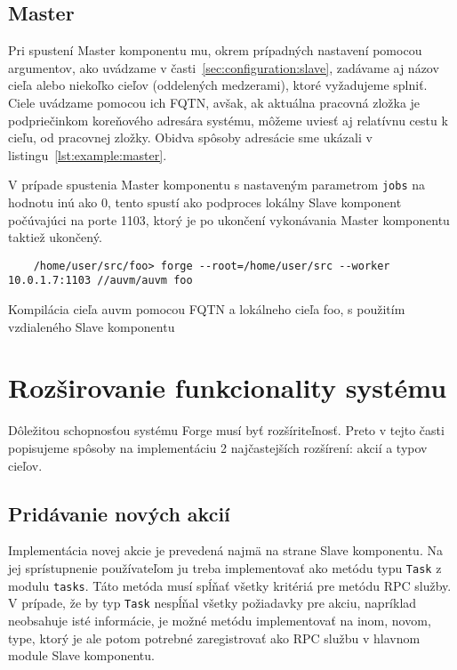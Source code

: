 \subsection{Master}
\label{sec:usage:client}

Pri spustení Master komponentu mu, okrem prípadných nastavení pomocou argumentov,
ako uvádzame v časti~\ref{sec:configuration:slave}, zadávame aj názov cieľa alebo
niekoľko cieľov (oddelených medzerami), ktoré vyžadujeme splniť. Ciele uvádzame
pomocou ich FQTN, avšak, ak aktuálna pracovná zložka je podpriečinkom koreňového
adresára systému, môžeme uviesť aj relatívnu cestu k cieľu, od pracovnej zložky.
Obidva spôsoby adresácie sme ukázali v listingu~\ref{lst:example:master}.

V prípade spustenia Master komponentu s nastaveným parametrom \texttt{jobs} na hodnotu
inú ako 0, tento spustí ako podproces lokálny Slave komponent počúvajúci na porte 1103,
ktorý je po ukončení vykonávania Master komponentu taktiež ukončený.

\begin{listing}
  \begin{verbatim}
    /home/user/src/foo> forge --root=/home/user/src --worker 10.0.1.7:1103 //auvm/auvm foo
  \end{verbatim}
  \caption[Ukážka kompilácie pomocou Forge]{Kompilácia cieľa auvm pomocou FQTN a lokálneho cieľa foo, s použitím vzdialeného Slave komponentu}
  \label{lst:example:master}
\end{listing}

\section{Roz\v{s}irovanie funkcionality syst\'{e}mu}
\label{sec:contributing}

Dôležitou schopnosťou systému Forge musí byť rozšíriteľnosť. Preto v tejto časti popisujeme
spôsoby na implementáciu 2 najčastejších rozšírení: akcií a typov cieľov.

\subsection{Prid\'{a}vanie nov\'{y}ch akci\'{i}}
\label{sec:contributing:actions}

Implementácia novej akcie je prevedená najmä na strane Slave komponentu. Na jej sprístupnenie
používateľom ju treba implementovať ako metódu typu \texttt{Task} z modulu \texttt{tasks}.
Táto metóda musí spĺňať všetky kritériá pre metódu RPC služby. V prípade, že by
typ \texttt{Task} nespĺňal všetky požiadavky pre akciu, napríklad neobsahuje isté
informácie, je možné metódu implementovať na inom, novom, type, ktorý je ale potom
potrebné zaregistrovať ako RPC službu v hlavnom module Slave komponentu.

